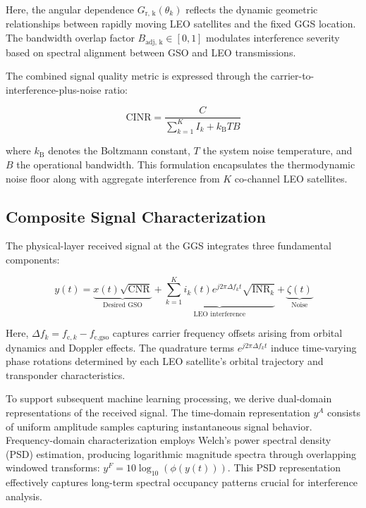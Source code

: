\documentclass[12pt]{article}
\begin{document}
Here, the angular dependence $G_{\text{r, k}}(\theta_k)$ reflects the dynamic geometric relationships between rapidly moving LEO satellites and the fixed GGS location. The bandwidth overlap factor $B_{\text{adj, k}} \in [0,1]$ modulates interference severity based on spectral alignment between GSO and LEO transmissions.

The combined signal quality metric is expressed through the carrier-to-interference-plus-noise ratio:

\begin{equation}
    \text{CINR} = \frac{C}{\sum_{k=1}^{K}I_k + k_{\text{B}}TB}
\end{equation}

where $k_{\text{B}}$ denotes the Boltzmann constant, $T$ the system noise temperature, and $B$ the operational bandwidth. This formulation encapsulates the thermodynamic noise floor along with aggregate interference from $K$ co-channel LEO satellites.

\subsection{Composite Signal Characterization}
The physical-layer received signal at the GGS integrates three fundamental components:

\begin{equation}
    y(t) = \underbrace{x(t)\sqrt{\text{CNR}}}_{\text{Desired GSO}} + \underbrace{\sum_{k=1}^{K} i_k(t)e^{j2\pi \Delta f_k t}\sqrt{\text{INR}_k}}_{\text{LEO interference}} + \underbrace{\zeta(t)}_{\text{Noise}}
\end{equation}

Here, $\Delta f_k = f_{\text{c},k} - f_{\text{c,gso}}$ captures carrier frequency offsets arising from orbital dynamics and Doppler effects. The quadrature terms $e^{j2\pi\Delta f_k t}$ induce time-varying phase rotations determined by each LEO satellite's orbital trajectory and transponder characteristics.

To support subsequent machine learning processing, we derive dual-domain representations of the received signal. The time-domain representation $y^A$ consists of uniform amplitude samples capturing instantaneous signal behavior. Frequency-domain characterization employs Welch's power spectral density (PSD) estimation, producing logarithmic magnitude spectra through overlapping windowed transforms: $y^F = 10\log_{10}(\phi(y(t)))$. This PSD representation effectively captures long-term spectral occupancy patterns crucial for interference analysis.
\end{document}
